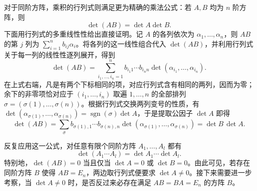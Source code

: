 \documentclass[UTF8,fontset=fandol,a4paper,12pt]{ctexart}
\theoremstyle{definition}
\begin{document}
对于同阶方阵，乘积的行列式则满足更为精确的乘法公式：若 $A,B$ 均为 $n$ 阶方阵，则
\[
 \boxed{\det(AB)=\det A\det B.}
\]
下面用行列式的多重线性性给出直接证明。记 $A$ 的各列依次为 $\alpha_1,\ldots,\alpha_n$，则 $AB$ 的第 $j$ 列为 $\sum_{i=1}^n b_{ij}\alpha_i$。将各列的这一线性组合代入 $\det(AB)$，并利用行列式关于每一列的线性性逐列展开，得到
\[
 \det(AB)=\sum_{i_1,\ldots,i_n=1}^{n}b_{i_1 1}\cdots b_{i_n n}
 \det(\alpha_{i_1},\ldots,\alpha_{i_n}).
\]
在上式右端，凡是有两个下标相同的项，对应行列式含有相同的两列，因而为零；余下的非零项恰对应于 $(i_1,\ldots,i_n)$ 取遍 $1,\ldots,n$ 的全部排列 $\sigma=(\sigma(1),\ldots,\sigma(n))$。根据行列式交换两列变号的性质，有 $\det(\alpha_{\sigma(1)},\ldots,\alpha_{\sigma(n)})=\operatorname{sgn}(\sigma)\det A$，于是提取公因子 $\det A$ 即得
\[
 \det(AB)=\sum_{\sigma}b_{\sigma(1),1}\cdots b_{\sigma(n),n}
 \det(\alpha_{\sigma(1)},\ldots,\alpha_{\sigma(n)})=\det B\,\det A.
\]

反复应用这一公式，对任意有限个同阶方阵 $A_1,\ldots,A_l$ 都有
\[
 \det(A_1\cdots A_l)=\det A_1\cdots\det A_l.
\]
特别地，$\det(AB)=0$ 当且仅当 $\det A=0$ 或 $\det B=0$。由此可见，若存在同阶方阵 $B$ 使得 $AB=E_n$，两边取行列式便要求 $\det A\ne0$。接下来需要进一步考察，当 $\det A\ne0$ 时，是否反过来必存在满足 $AB=BA=E_n$ 的方阵 $B$。
\end{document}
